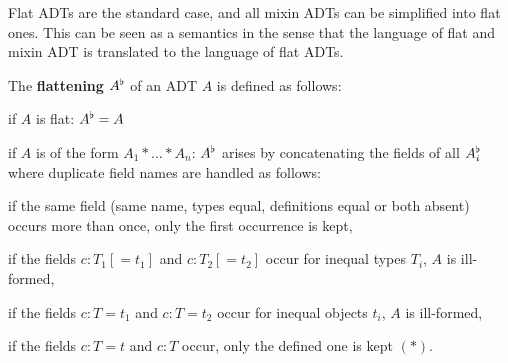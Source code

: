 Flat ADTs are the standard case, and all mixin ADTs can be simplified into flat ones.
This can be seen as a semantics in the sense that the language of flat and mixin ADT is translated to the language of flat ADTs.
\begin{definition}\label{def:mixinflat}
The \textbf{flattening} $A^\flat$ of an ADT $A$ is defined as follows:
\begin{compactitem}
 \item if $A$ is flat: $A^\flat=A$
 \item if $A$ is of the form $A_1*\ldots*A_n$:
 $A^\flat$ arises by concatenating the fields of all $A_i^\flat$ where duplicate field names are handled as follows:
  \begin{compactitem}
   \item if the same field (same name, types equal, definitions equal or both absent) occurs more than once, only the first occurrence is kept,
   \item if the fields $c:T_1[=t_1]$ and $c:T_2[=t_2]$ occur for inequal types $T_i$, $A$ is ill-formed,
   \item if the fields $c:T=t_1$ and $c:T=t_2$ occur for inequal objects $t_i$, $A$ is ill-formed,
   \item if the fields $c:T=t$ and $c:T$ occur, only the defined one is kept $(\ast)$.
  \end{compactitem}
\end{compactitem}
\end{definition}

